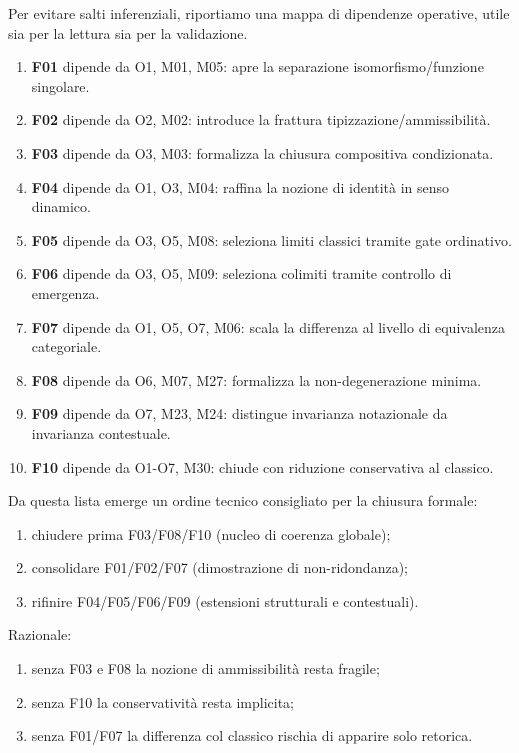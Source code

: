Per evitare salti inferenziali, riportiamo una mappa di dipendenze operative, utile sia per la lettura sia per la validazione.

\begin{enumerate}
\def\labelenumi{\arabic{enumi}.}
\tightlist
\item
  \textbf{F01} dipende da O1, M01, M05: apre la separazione isomorfismo/funzione singolare.
\item
  \textbf{F02} dipende da O2, M02: introduce la frattura tipizzazione/ammissibilità.
\item
  \textbf{F03} dipende da O3, M03: formalizza la chiusura compositiva condizionata.
\item
  \textbf{F04} dipende da O1, O3, M04: raffina la nozione di identità in senso dinamico.
\item
  \textbf{F05} dipende da O3, O5, M08: seleziona limiti classici tramite gate ordinativo.
\item
  \textbf{F06} dipende da O3, O5, M09: seleziona colimiti tramite controllo di emergenza.
\item
  \textbf{F07} dipende da O1, O5, O7, M06: scala la differenza al livello di equivalenza categoriale.
\item
  \textbf{F08} dipende da O6, M07, M27: formalizza la non-degenerazione minima.
\item
  \textbf{F09} dipende da O7, M23, M24: distingue invarianza notazionale da invarianza contestuale.
\item
  \textbf{F10} dipende da O1-O7, M30: chiude con riduzione conservativa al classico.
\end{enumerate}

Da questa lista emerge un ordine tecnico consigliato per la chiusura formale:

\begin{enumerate}
\def\labelenumi{\arabic{enumi}.}
\tightlist
\item
  chiudere prima F03/F08/F10 (nucleo di coerenza globale);
\item
  consolidare F01/F02/F07 (dimostrazione di non-ridondanza);
\item
  rifinire F04/F05/F06/F09 (estensioni strutturali e contestuali).
\end{enumerate}

Razionale:

\begin{enumerate}
\def\labelenumi{\arabic{enumi}.}
\tightlist
\item
  senza F03 e F08 la nozione di ammissibilità resta fragile;
\item
  senza F10 la conservatività resta implicita;
\item
  senza F01/F07 la differenza col classico rischia di apparire solo retorica.
\end{enumerate}

